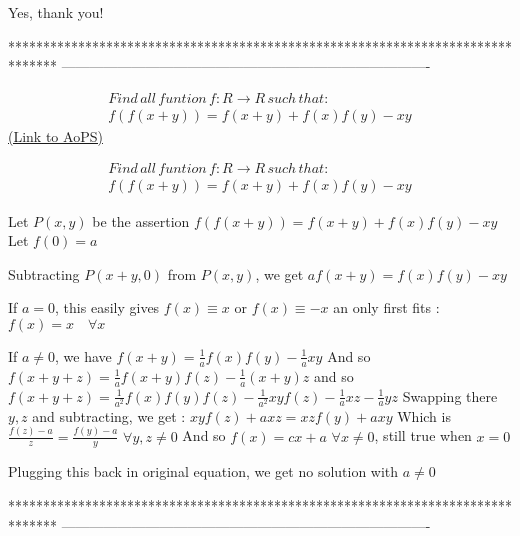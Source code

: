 \begin{solution}
	Yes, thank you!
\end{solution}
*******************************************************************************
-------------------------------------------------------------------------------

\begin{problem}
	\[\begin{array}{l}
Find\,all\,funtion\,f:R \to R\,such\,that:\\
f(f(x + y)) = f(x + y) + f(x)f(y) - xy
\end{array}\]
	\flushright \href{https://artofproblemsolving.com/community/c6h1623893}{(Link to AoPS)}
\end{problem}



\begin{solution}
	\begin{tcolorbox}\[\begin{array}{l}
Find\,all\,funtion\,f:R \to R\,such\,that:\\
f(f(x + y)) = f(x + y) + f(x)f(y) - xy
\end{array}\]\end{tcolorbox}
Let $P(x,y)$ be the assertion $f(f(x+y))=f(x+y)+f(x)f(y)-xy$
Let $f(0)=a$

Subtracting $P(x+y,0)$ from $P(x,y)$, we get $af(x+y)=f(x)f(y)-xy$

If $a=0$, this easily gives $f(x)\equiv x$ or $f(x)\equiv -x$ an only first fits :
$\boxed{f(x)=x\quad\forall x}$

If $a\ne 0$, we have $f(x+y)=\frac 1af(x)f(y)-\frac 1axy$
And so $f(x+y+z)=\frac 1af(x+y)f(z)-\frac 1a(x+y)z$ and so
$f(x+y+z)=\frac 1{a^2}f(x)f(y)f(z)-\frac 1{a^2}xyf(z)-\frac 1axz-\frac 1ayz$
Swapping there $y,z$ and subtracting, we get :
$xyf(z)+axz=xzf(y)+axy$
Which is $\frac{f(z)-a}z=\frac{f(y)-a}y$ $\forall y,z\ne 0$
And so $f(x)=cx+a$ $\forall x\ne 0$, still true when $x=0$

Plugging this back in original equation, we get no solution with $a\ne 0$



\end{solution}
*******************************************************************************
-------------------------------------------------------------------------------

